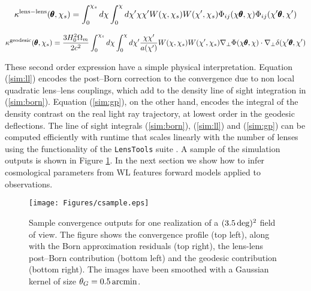 \documentclass[reprint,aps,prd,superscriptaddress,showkeys,showpacs]{revtex4-1}
\newcommand{\ttt}[1]{\texttt{#1}}
\newcommand\pt{\pmb{\theta}}
\begin{document}
\begin{widetext}

\begin{equation}
\label{sim:ll}
\kappa^{\rm lens-lens}(\pt,\chi_s) = \int_0^{\chi_s}d\chi\int_0^\chi d\chi' \chi\chi' W(\chi,\chi_s)W(\chi',\chi_s)\Phi_{ij}(\chi\pt,\chi)\Phi_{ij}(\chi'\pt,\chi')
\end{equation}

\begin{equation}
\label{sim:gp}
\kappa^{\rm geodesic}(\pt,\chi_s) = \frac{3H_0^2\Omega_m}{2c^2}\int_0^{\chi_s}d\chi\int_0^\chi d\chi' \frac{\chi\chi'}{a(\chi')} W(\chi,\chi_s)W(\chi',\chi_s)\nabla_\perp\Phi(\chi\pt,\chi)\cdot\nabla_\perp\delta(\chi'\pt,\chi')
\end{equation}

\end{widetext}
%
These second order expression have a simple physical interpretation. Equation (\ref{sim:ll}) encodes the post--Born correction to the convergence due to non local quadratic lens--lens couplings, which add to the density line of sight integration in (\ref{sim:born}). Equation (\ref{sim:gp}), on the other hand, encodes the integral of the density contrast on the real light ray trajectory, at lowest order in the geodesic deflections. The line of sight integrals (\ref{sim:born}), (\ref{sim:ll}) and (\ref{sim:gp}) can be computed efficiently with runtime that scales linearly with the number of lenses using the functionality of the \ttt{LensTools} suite \citep{LensTools-paper}. A sample of the simulation outputs is shown in Figure \ref{fig:csample}. In the next section we show how to infer cosmological parameters from WL features forward models applied to observations.  

\begin{figure*}
\begin{center}
\texttt{[image: Figures/csample.eps]}
\end{center}
\caption{Sample convergence outputs for one realization of a $(3.5\,{\rm deg})^2$ field of view. The figure shows the convergence profile (top left), along with the Born approximation residuals (top right), the lens-lens post--Born contribution (bottom left) and the geodesic contribution (bottom right). The images have been smoothed with a Gaussian kernel of size $\theta_G=0.5\,{\rm arcmin}$.}
\label{fig:csample}
\end{figure*} 

\end{document}
